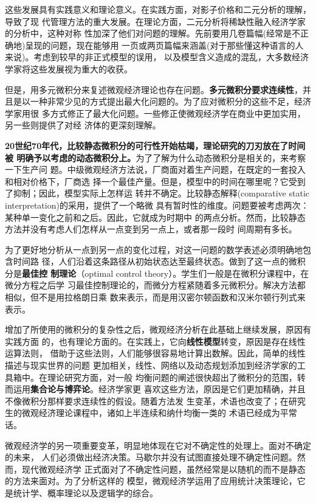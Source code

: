 这些发展具有实践意义和理论意义。在实践方面，对影子价格和二元分析的理解，导致了现
代管理方法的重大发展。在理论方面，二元分析将稀缺性融入经济学家的分析中，这种对称
性加深了他们对问题的理解。先前要用几卷篇幅(经常是不正确地)呈现的问题，现在能够用
一页或两页篇幅来涵盖(对于那些懂这种语言的人来说)。考虑到较早的非正式模型的误用，
以及模型含义造成的混乱，大多数经济学家将这些发展视为重大的收获。

但是，用多元微积分来复述微观经济理论也存在问题。\textbf{多元微积分要求连续性}，并
且是以一种非常少见的方式提出最大化问题的。为了应对微积分的这些不足，经济学家用很
多方式修正了最大化问题。一些修正使微观经济学在商业中更加实用，另一些则提供了对经
济体的更深刻理解。

\textbf{20世纪70年代，比较静态微积分的可行性开始枯竭，理论研究的刀刃放在了时间被
  明确予以考虑的动态微积分上。}为了了解为什么动态微积分是相关的，来考察一下生产问
题。中级微观经济方法说，厂商面对着生产问题，在既定的一套投入和相对价格下，厂商选
择一个最佳产量。但是，模型中的时间在哪里呢？它受到了抑制；因此，模型实际上怎样运
转并不确定。比较静态解释(comparative static interpretation)的采用，提供了一个略微
具有暂时性的维度。问题要被考虑两次：某种单一变化之前和之后。因此，它就成为时期中
的两点分析。然而，比较静态方法并没有考虑人们怎样从一点变到另一点上，或者那一段时
间周期有多长。

为了更好地分析从一点到另一点的变化过程，对这一问题的数学表述必须明确地包含时间路
径，人们沿着这条路径从初始状态达至最终状态。做到了这一点的微积分是\textbf{最佳控
  制理论}（optimal control theory）。学生们一般是在微积分课程中，在微分方程之后学
习最佳控制理论的，而微分方程紧随着多元微积分。解决方法都相似，但不是用拉格朗日乘
数来表示，而是用汉密尔顿函数和汉米尔顿行列式来表示。

增加了所使用的微积分的复杂性之后，微观经济分析在此基础上继续发展，原因有实践方面
的，也有理论方面的。在实践上，它向\textbf{线性模型}转变，原因是存在线性运算法则，
借助于这些法则，人们能够很容易地计算出数解。因此，简单的线性描述与现实世界的问题
更加相关，线性、网络以及动态规划添加到经济学家的工具箱中。在理论研究方面，对一般
均衡问题的阐述很快超出了微积分的范围，转而运用\textbf{集合论与博弈论}。经济学家更
喜欢这些方法，原因是它们更加精确，并且不像微积分那样要求连续性的假设。随着方法发
生变革，术语也改变了；在研究生的微观经济理论课程中，诸如上半连续和纳什均衡一类的
术语已经成为平常话。

微观经济学的另一项重要变革，明显地体现在它对不确定性的处理上。面对不确定的未来，
人们必须做出经济决策。马歇尔并没有试图直接处理不确定性问题。然而，现代微观经济学
正式面对了不确定性问题，虽然经常是以随机的而不是静态的方法来面对。为了分析这样的
模型，微观经济学运用了应用统计决策理论，它是统计学、概率理论以及逻辑学的综合。

